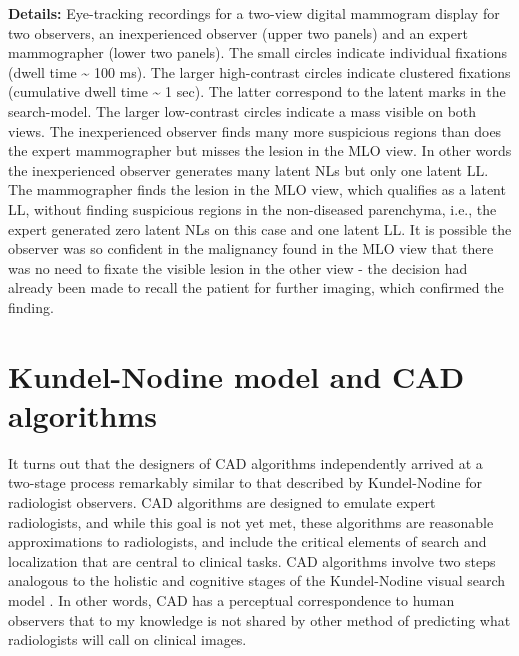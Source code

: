 \documentclass[
]{book}
\begin{document}
\textbf{Details:} Eye-tracking recordings for a two-view digital mammogram display for two observers, an inexperienced observer (upper two panels) and an expert mammographer (lower two panels). The small circles indicate individual fixations (dwell time \textasciitilde{} 100 ms). The larger high-contrast circles indicate clustered fixations (cumulative dwell time \textasciitilde{} 1 sec). The latter correspond to the latent marks in the search-model. The larger low-contrast circles indicate a mass visible on both views. The inexperienced observer finds many more suspicious regions than does the expert mammographer but misses the lesion in the MLO view. In other words the inexperienced observer generates many latent NLs but only one latent LL. The mammographer finds the lesion in the MLO view, which qualifies as a latent LL, without finding suspicious regions in the non-diseased parenchyma, i.e., the expert generated zero latent NLs on this case and one latent LL. It is possible the observer was so confident in the malignancy found in the MLO view that there was no need to fixate the visible lesion in the other view - the decision had already been made to recall the patient for further imaging, which confirmed the finding.

\hypertarget{visual-search-Kundel-Nodine-model-CAD}{%
\section{Kundel-Nodine model and CAD algorithms}\label{visual-search-Kundel-Nodine-model-CAD}}

It turns out that the designers of CAD algorithms independently arrived at a two-stage process remarkably similar to that described by Kundel-Nodine for radiologist observers. CAD algorithms are designed to emulate expert radiologists, and while this goal is not yet met, these algorithms are reasonable approximations to radiologists, and include the critical elements of search and localization that are central to clinical tasks. CAD algorithms involve two steps analogous to the holistic and cognitive stages of the Kundel-Nodine visual search model \citep{nodine1987using, kundel2004modeling, kundel1983visual}. In other words, CAD has a perceptual correspondence to human observers that to my knowledge is not shared by other method of predicting what radiologists will call on clinical images.
\end{document}
